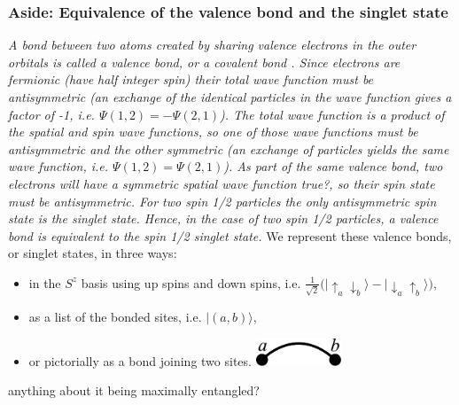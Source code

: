 \subsubsection{Aside: Equivalence of the valence bond and the singlet state}
{\it{A bond between two atoms created by sharing valence electrons in the outer orbitals is called a valence bond, or a covalent bond \cite{Slater1931,Pauling1933}.
Since electrons are fermionic (have half integer spin) their total
wave function must be antisymmetric (an exchange of the identical particles in the wave function
gives a factor of -1, i.e. $\Psi(1,2) = -\Psi(2,1)$).
The total wave function is a product of the spatial and spin wave functions, so one of those wave functions must be antisymmetric and the other symmetric (an exchange of particles yields the same wave function, i.e. $\Psi(1,2) = \Psi(2,1)$).
As part of the same valence bond, two electrons will have a symmetric spatial wave function {\color{red} true?}, so their spin state must be antisymmetric.  For two spin 1/2 particles the only antisymmetric spin state is the singlet state.  
Hence, in the case of two spin 1/2 particles, a valence bond is equivalent to the spin 1/2 singlet state.}}
We represent these valence bonds, or singlet states, in three ways: 
\begin{itemize}
\item{in the $S^z$ basis using up spins and down spins, 
i.e. $\tfrac{1}{\sqrt{2}}\big(\lvert \uparrow_a \downarrow_b \rangle - \lvert \downarrow_a \uparrow_b \rangle\big)$,}
\item{ as a list of the bonded sites, i.e. $\lvert(a,b)\rangle$,}
\item{
or pictorially as a bond joining two sites.\; \includegraphics[width=1in]{./figures/made/bond2.pdf}}
\end{itemize}

{\color{red} anything about it being maximally entangled?}

